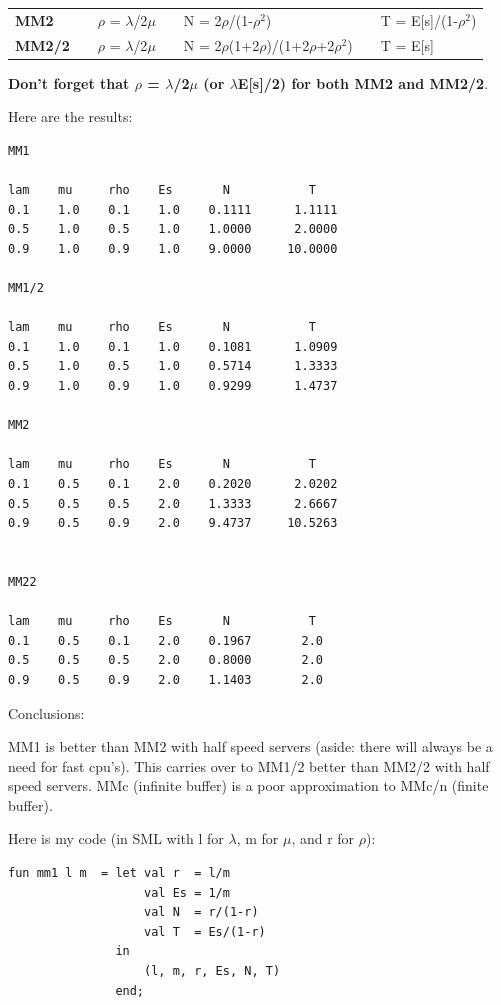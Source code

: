 \documentclass[12pt,fleqn]{report}
\begin{document}
\begin{enumerate}
\begin{center}
\begin{tabular}{lc lc lc l}
{\bf MM2} & & $\rho$ = ${\lambda}$/2${\mu}$ &&
          N  = 2$\rho$/(1-$\rho^2$)&&
          T =  E[s]/(1-$\rho^2$)\\[0.1in]

{\bf MM2/2} && $\rho$ = $\lambda$/2$\mu$&&
N     =  2$\rho$(1+2$\rho$)/(1+2$\rho$+2$\rho^2$) &&
T     =  E[s] \\[0.1in]
\end{tabular}
\end{center}

{\bf Don't forget that $\rho$ = $\lambda$/2$\mu$ (or $\lambda$E[s]/2)
for both MM2 and MM2/2}. 

Here are the results:


\small
\begin{verbatim}
MM1

lam    mu     rho    Es       N           T
0.1    1.0    0.1    1.0    0.1111      1.1111
0.5    1.0    0.5    1.0    1.0000      2.0000
0.9    1.0    0.9    1.0    9.0000     10.0000

MM1/2

lam    mu     rho    Es       N           T
0.1    1.0    0.1    1.0    0.1081      1.0909
0.5    1.0    0.5    1.0    0.5714      1.3333
0.9    1.0    0.9    1.0    0.9299      1.4737

MM2

lam    mu     rho    Es       N           T
0.1    0.5    0.1    2.0    0.2020      2.0202
0.5    0.5    0.5    2.0    1.3333      2.6667
0.9    0.5    0.9    2.0    9.4737     10.5263


MM22

lam    mu     rho    Es       N           T
0.1    0.5    0.1    2.0    0.1967       2.0
0.5    0.5    0.5    2.0    0.8000       2.0
0.9    0.5    0.9    2.0    1.1403       2.0
\end{verbatim}
\normalsize

Conclusions: 

MM1 is better than MM2 with half speed servers (aside:
there will always be a need for fast cpu's).
This carries over to MM1/2 better than MM2/2 with half speed servers.
MMc (infinite buffer) is a poor approximation to MMc/n (finite buffer).

Here is my code (in SML with l for $\lambda$, m for $\mu$, and r for $\rho$):

\small
\begin{verbatim}
fun mm1 l m  = let val r  = l/m
                   val Es = 1/m
                   val N  = r/(1-r)
                   val T  = Es/(1-r)
               in
                   (l, m, r, Es, N, T)
               end;


\end{verbatim}
\end{enumerate}
\end{document}
